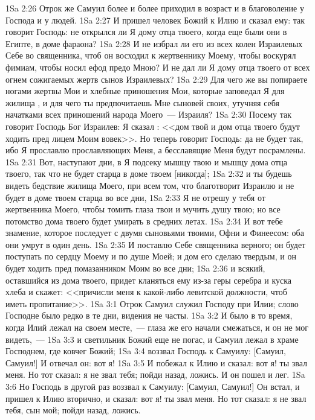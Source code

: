 \rsbpar\vs 1Sa 2:26 Отрок же Самуил более и более приходил в возраст и в благоволение у Господа и у людей.
\vs 1Sa 2:27 И пришел человек Божий к Илию и сказал ему: так говорит Господь: не открылся ли Я дому отца твоего, когда еще были они в Египте, в доме фараона?
\vs 1Sa 2:28 И не избрал ли его из всех колен Израилевых Себе во священника, чтоб он восходил к жертвеннику Моему, чтобы воскурял фимиам, чтобы носил ефод предо Мною? И не дал ли Я дому отца твоего от всех огнем сожигаемых жертв сынов Израилевых?
\vs 1Sa 2:29 Для чего же вы попираете ногами жертвы Мои и хлебные приношения Мои, которые заповедал Я для жилища , и для чего ты предпочитаешь Мне сыновей своих, утучняя себя начатками всех приношений народа Моего~--- Израиля?
\vs 1Sa 2:30 Посему так говорит Господь Бог Израилев: Я сказал : <<дом твой и дом отца твоего будут ходить пред лицем Моим вовек>>. Но теперь говорит Господь: да не будет так, ибо Я прославлю прославляющих Меня, а бесславящие Меня будут посрамлены.
\vs 1Sa 2:31 Вот, наступают дни, в  Я подсеку мышцу твою и мышцу дома отца твоего, так что не будет старца в доме твоем [никогда];
\vs 1Sa 2:32 и ты будешь видеть бедствие жилища Моего, при всем том, что  благотворит Израилю и не будет в доме твоем старца во все дни,
\vs 1Sa 2:33 Я не отрешу у тебя  от жертвенника Моего, чтобы томить глаза твои и мучить душу твою; но все потомство дома твоего будет умирать в средних летах.
\vs 1Sa 2:34 И вот тебе знамение, которое последует с двумя сыновьями твоими, Офни и Финеесом: оба они умрут в один день.
\vs 1Sa 2:35 И поставлю Себе священника верного; он будет поступать по сердцу Моему и по душе Моей; и дом его сделаю твердым, и он будет ходить пред помазанником Моим во все дни;
\vs 1Sa 2:36 и всякий, оставшийся из дома твоего, придет кланяться ему из-за геры серебра и куска хлеба и скажет: <<причисли меня к какой-либо левитской должности, чтоб иметь пропитание>>.
\vs 1Sa 3:1 Отрок Самуил служил Господу при Илии; слово Господне было редко в те дни, видения  не часты.
\vs 1Sa 3:2 И было в то время, когда Илий лежал на своем месте,~--- глаза же его начали смежаться, и он не мог видеть,~---
\vs 1Sa 3:3 и светильник Божий еще не погас, и Самуил лежал в храме Господнем, где ковчег Божий;
\vs 1Sa 3:4 воззвал Господь к Самуилу: [Самуил, Самуил!] И отвечал он: вот я!
\vs 1Sa 3:5 И побежал к Илию и сказал: вот я! ты звал меня. Но тот сказал: я не звал тебя; пойди назад, ложись. И он пошел и лег.
\vs 1Sa 3:6 Но Господь в другой раз воззвал к Самуилу: [Самуил, Самуил!] Он встал, и пришел к Илию вторично, и сказал: вот я! ты звал меня. Но тот сказал: я не звал тебя, сын мой; пойди назад, ложись.
